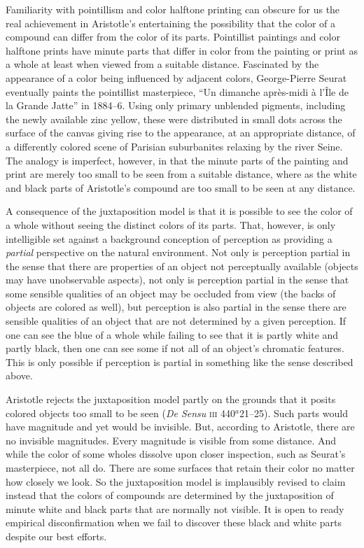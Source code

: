 Familiarity with pointillism and color halftone printing can obscure for us the real achievement in Aristotle's entertaining the possibility that the color of a compound can differ from the color of its parts. Pointillist paintings and color halftone prints have minute parts that differ in color from the painting or print as a whole at least when viewed from a suitable distance. Fascinated by the appearance of a color being influenced by adjacent colors, George-Pierre Seurat eventually paints the pointillist masterpiece, “Un dimanche après-midi à l'Île de la Grande Jatte” in 1884--6. Using only primary unblended pigments, including the newly available zinc yellow, these were distributed in small dots across the surface of the canvas giving rise to the appearance, at an appropriate distance, of a differently colored scene of Parisian suburbanites relaxing by the river Seine. The analogy is imperfect, however, in that the minute parts of the painting and print are merely too small to be seen from a suitable distance, where as the white and black parts of Aristotle's compound are too small to be seen at any distance.

A consequence of the juxtaposition model is that it is possible to see the color of a whole without seeing the distinct colors of its parts. That, however, is only intelligible set against a background conception of perception as providing a \emph{partial} perspective on the natural environment. Not only is perception partial in the sense that there are properties of an object not perceptually available (objects may have unobservable aspects), not only is perception partial in the sense that some sensible qualities of an object may be occluded from view (the backs of objects are colored as well), but perception is also partial in the sense there are sensible qualities of an object that are not determined by a given perception. If one can see the blue of a whole while failing to see that it is partly white and partly black, then one can see some if not all of an object's chromatic features. This is only possible if perception is partial in something like the sense described above. 

Aristotle rejects the juxtaposition model partly on the grounds that it posits colored objects too small to be seen (\emph{De Sensu} \textsc{iii} 440\( ^{a} \)21--25). Such parts would have magnitude and yet would be invisible. But, according to Aristotle, there are no invisible magnitudes. Every magnitude is visible from some distance. And while the color of some wholes dissolve upon closer inspection, such as Seurat's masterpiece, not all do. There are some surfaces that retain their color no matter how closely we look. So the juxtaposition model is implausibly revised to claim instead that the colors of compounds are determined by the juxtaposition of minute white and black parts that are normally not visible. It is open to ready empirical disconfirmation when we fail to discover these black and white parts despite our best efforts. \change

